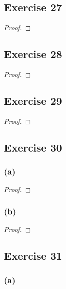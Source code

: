 \documentclass[14pt]{extarticle}
\begin{document}
\subsection{Exercise 27}

\begin{proof}

\end{proof}

\subsection{Exercise 28}

\begin{proof}

\end{proof}

\subsection{Exercise 29}

\begin{proof}

\end{proof}

\subsection{Exercise 30}

\subsubsection{(a)}

\begin{proof}

\end{proof}

\subsubsection{(b)}

\begin{proof}

\end{proof}

\subsection{Exercise 31}

\subsubsection{(a)}
\end{document}
